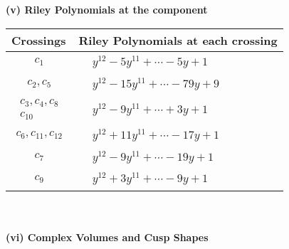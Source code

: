 \documentclass[1p]{elsarticle_modified}
\theoremstyle{definition}
\begin{document}
\newpage\renewcommand{\arraystretch}{1}
\flushleft \textbf{(v) Riley Polynomials at the component}\newline \\
\begin{tabular}{m{50pt}|m{274pt}}
Crossings & \hspace{64pt}Riley Polynomials at each crossing \\
\hline $$\begin{aligned}c_{1}\end{aligned}$$&$\begin{aligned}
&y^{12}-5 y^{11}+\cdots-5 y+1
\end{aligned}$\\
\hline $$\begin{aligned}c_{2},c_{5}\end{aligned}$$&$\begin{aligned}
&y^{12}-15 y^{11}+\cdots-79 y+9
\end{aligned}$\\
\hline $$\begin{aligned}c_{3},c_{4},c_{8}\\c_{10}\end{aligned}$$&$\begin{aligned}
&y^{12}-9 y^{11}+\cdots+3 y+1
\end{aligned}$\\
\hline $$\begin{aligned}c_{6},c_{11},c_{12}\end{aligned}$$&$\begin{aligned}
&y^{12}+11 y^{11}+\cdots-17 y+1
\end{aligned}$\\
\hline $$\begin{aligned}c_{7}\end{aligned}$$&$\begin{aligned}
&y^{12}-9 y^{11}+\cdots-19 y+1
\end{aligned}$\\
\hline $$\begin{aligned}c_{9}\end{aligned}$$&$\begin{aligned}
&y^{12}+3 y^{11}+\cdots-9 y+1
\end{aligned}$\\
\hline
\end{tabular}\\~\\
\newpage\flushleft \textbf{(vi) Complex Volumes and Cusp Shapes}
\end{document}
